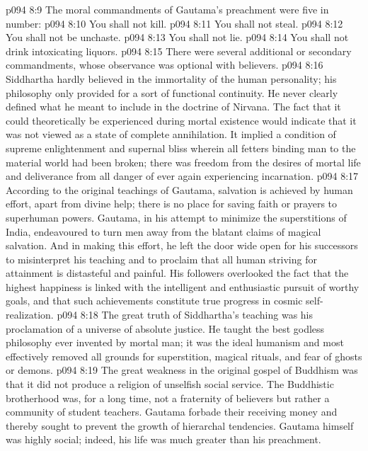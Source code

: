 \vs p094 8:9 \pc The moral commandments of Gautama’s preachment were five in number:
\vs p094 8:10 \bibnobreakspace You shall not kill.
\vs p094 8:11 \bibnobreakspace You shall not steal.
\vs p094 8:12 \bibnobreakspace You shall not be unchaste.
\vs p094 8:13 \bibnobreakspace You shall not lie.
\vs p094 8:14 \bibnobreakspace You shall not drink intoxicating liquors.
\vs p094 8:15 \pc There were several additional or secondary commandments, whose observance was optional with believers.
\vs p094 8:16 \pc Siddhartha hardly believed in the immortality of the human personality; his philosophy only provided for a sort of functional continuity. He never clearly defined what he meant to include in the doctrine of Nirvana. The fact that it could theoretically be experienced during mortal existence would indicate that it was not viewed as a state of complete annihilation. It implied a condition of supreme enlightenment and supernal bliss wherein all fetters binding man to the material world had been broken; there was freedom from the desires of mortal life and deliverance from all danger of ever again experiencing incarnation.
\vs p094 8:17 According to the original teachings of Gautama, salvation is achieved by human effort, apart from divine help; there is no place for saving faith or prayers to superhuman powers. Gautama, in his attempt to minimize the superstitions of India, endeavoured to turn men away from the blatant claims of magical salvation. And in making this effort, he left the door wide open for his successors to misinterpret his teaching and to proclaim that all human striving for attainment is distasteful and painful. His followers overlooked the fact that the highest happiness is linked with the intelligent and enthusiastic pursuit of worthy goals, and that such achievements constitute true progress in cosmic self\hyp{}realization.
\vs p094 8:18 The great truth of Siddhartha’s teaching was his proclamation of a universe of absolute justice. He taught the best godless philosophy ever invented by mortal man; it was the ideal humanism and most effectively removed all grounds for superstition, magical rituals, and fear of ghosts or demons.
\vs p094 8:19 The great weakness in the original gospel of Buddhism was that it did not produce a religion of unselfish social service. The Buddhistic brotherhood was, for a long time, not a fraternity of believers but rather a community of student teachers. Gautama forbade their receiving money and thereby sought to prevent the growth of hierarchal tendencies. Gautama himself was highly social; indeed, his life was much greater than his preachment.
